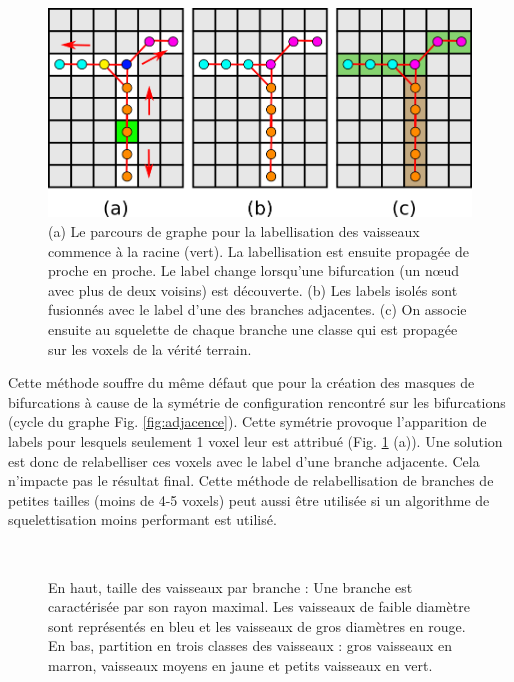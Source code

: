 \begin{figure}[!ht]
  \centering
  \includegraphics[width=\textwidth]{Images/vessels_size_creation.png}
  \caption{ (a) Le parcours de graphe pour la labellisation des vaisseaux commence à la racine (vert). La labellisation est ensuite propagée de proche en proche. Le label change lorsqu'une bifurcation (un nœud avec plus de deux voisins) est découverte. (b) Les labels isolés sont fusionnés avec le label d'une des branches adjacentes. (c) On associe ensuite au squelette de chaque branche une classe qui est propagée sur les voxels de la vérité terrain.}
  \label{fig:graph_traversal}
\end{figure}
Cette méthode souffre du même défaut que pour la création des masques de bifurcations à cause de la symétrie de configuration rencontré sur les bifurcations (cycle du graphe Fig. \ref{fig:adjacence}). Cette symétrie provoque l'apparition de labels pour lesquels seulement 1 voxel leur est attribué (Fig. \ref{fig:graph_traversal} (a)). Une solution est donc de relabelliser ces voxels avec le label d'une branche adjacente. Cela n'impacte pas le résultat final. Cette méthode de relabellisation de branches de petites tailles (moins de 4-5 voxels) peut aussi être utilisée si un algorithme de squelettisation moins performant est utilisé.
\begin{figure}[!ht]
  \centering
  \\
  \caption{En haut, taille des vaisseaux par branche : Une branche est caractérisée par son rayon maximal. Les vaisseaux de faible diamètre sont représentés en bleu et les vaisseaux de gros diamètres en rouge. En bas, partition en trois classes des vaisseaux : gros vaisseaux en marron, vaisseaux moyens en jaune et petits vaisseaux en vert.}
  \label{fig:vessels_partition}
\end{figure}
